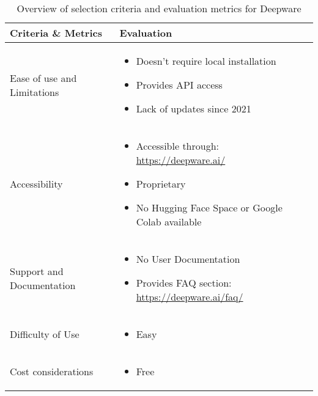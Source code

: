 \begin{table}[htpb]
	\caption{Overview of selection criteria and evaluation metrics for Deepware}\label{tab:deepware-overview}
	\centering
	\small
	\begin{tabularx}{\textwidth}{l X}
		\toprule
		\textbf{Criteria \& Metrics} & \textbf{Evaluation}                                        \\
		\midrule
		Ease of use and Limitations  & \begin{itemize}[nosep,nolistsep,noitemsep]
			                               \item Doesn't require local installation
			                               \item Provides \ac{API} access
			                               \item Lack of updates since 2021
		                               \end{itemize}                  \\
		Accessibility                & \begin{itemize}[nosep,nolistsep,noitemsep]
			                               \item Accessible through: \url{https://deepware.ai/}
			                               \item Proprietary
			                               \item No Hugging Face Space or Google Colab available
		                               \end{itemize}       \\
		Support and Documentation    & \begin{itemize}[nosep,nolistsep,noitemsep]
			                               \item No User Documentation
			                               \item Provides FAQ section: \url{https://deepware.ai/faq/}
		                               \end{itemize}  \\
		Difficulty of Use            & \begin{itemize}[nosep,nolistsep,noitemsep]
			                               \item Easy
		                               \end{itemize}                  \\
		Cost considerations          & \begin{itemize}[nosep,nolistsep,noitemsep]
			                               \item Free

\end{itemize}
\end{tabularx}
\end{table}
